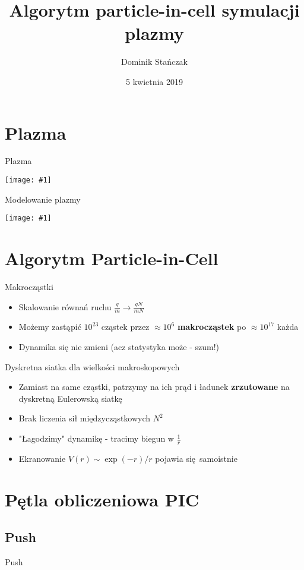 \documentclass{beamer}
\title[Particle-in-cell]{Algorytm particle-in-cell symulacji plazmy}
\author{Dominik Stańczak}
\date{5 kwietnia 2019}
\newcommand {\graphic}[1] {
        \begin{center}
            \texttt{[image: \#1]}
        \end{center}
}
\begin{document}
    \frame{\titlepage}
    \section{Plazma}
        \begin{frame}[t]{Plazma}
          \graphic{plasma_uses}
        \end{frame}
        \begin{frame}[t]{Modelowanie plazmy}
          \graphic{methods}
        \end{frame}
    \section{Algorytm Particle-in-Cell}
        \begin{frame}[t]{Makrocząstki}
          \begin{itemize}[<+->]
            \item Skalowanie równań ruchu $\frac{q}{m} \to \frac{qN}{mN}$
            \item Możemy zastąpić $10^{23}$ cząstek przez $\approx 10^{6}$ \textbf{makrocząstek} po $\approx 10^{17}$ każda
            \item Dynamika się nie zmieni (acz statystyka może - szum!)
          \end{itemize}
        \end{frame}

        \begin{frame}[t]{Dyskretna siatka dla wielkości makroskopowych}
          \begin{itemize}[<+->]
            \item Zamiast na same cząstki, patrzymy na ich prąd i ładunek \textbf{zrzutowane} na dyskretną Eulerowską siatkę
            \item Brak liczenia sił międzycząstkowych $N^2$
            \item "Łagodzimy" dynamikę - tracimy biegun w $\frac{1}{r}$
            \item Ekranowanie $V(r) \sim \exp(-r) / r$ pojawia się samoistnie
          \end{itemize}
        \end{frame}
        
    \section{Pętla obliczeniowa PIC}

        \subsection{Push}
        \begin{frame}[t]{Push}
          
        \end{frame}
\end{document}
